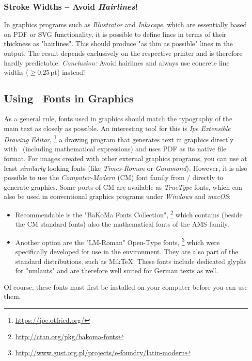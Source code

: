 \subsubsection{Stroke Widths -- Avoid \emph{Hairlines}!}

In graphics programs such as \emph{Illustrator} and \emph{Inkscape}, which
are essentially based on PDF or SVG functionality, it is possible to define
lines in terms of their thickness as "hairlines". This should produce "as
thin as possible" lines in the output. The result depends exclusively on the
respective printer and is therefore hardly predictable. \emph{Conclusion:}
Avoid hairlines and always use concrete line widths ($\geq 0.25\,
\mathrm{pt}$) instead!

\subsection{Using \tex\ Fonts in Graphics}
\label{sec:TexFontsInGraphics}

As a general rule, fonts used in graphics should match the typography of the
main text as closely as possible. An interesting tool for this is \emph{Ipe
Extensible Drawing Editor},%
\footnote{\url{https://ipe.otfried.org/}}
a drawing program that generates text in graphics directly with \latex\
(including mathematical expressions) and uses PDF as its native file format.
For images created with other external graphics programs, you can use at
least \emph{similarly} looking fonts (like \emph{Times-Roman} or
\emph{Garamond}). However, it is also possible to use the
\emph{Computer-Modern} (CM) font family from {\tex}/{\latex} directly to
generate graphics. Some ports of CM are available as \emph{TrueType} fonts,
which can also be used in conventional graphics programs under \emph{Windows}
and \emph{macOS}:
%
\begin{itemize}
    \item
    Recommendable is the "BaKoMa Fonts Collection",%
    \footnote{\url{http://ctan.org/pkg/bakoma-fonts}}
    which contains (beside the CM standard fonts) also the mathematical fonts
    of the
    AMS family.
    \item
    Another option are the "LM-Roman" Open-Type fonts,%
    \footnote{\url{http://www.gust.org.pl/projects/e-foundry/latin-modern}}
    which were specifically developed for use in the \latex environment.
    They are also part of the standard \latex distributions, such as MikTeX.
    These fonts include dedicated glyphs for "umlauts" and are therefore well
    suited for German texts as well.
\end{itemize}
%
Of course, these fonts must first be installed on your computer before 
you can use them.

